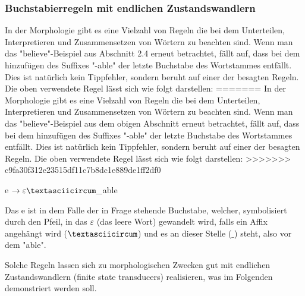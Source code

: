 \documentclass[12pt]{article}
\begin{document}
\subsubsection{Buchstabierregeln mit endlichen Zustandswandlern}

In der Morphologie gibt es eine Vielzahl von Regeln die bei dem Unterteilen, Interpretieren und Zusammensetzen von Wörtern zu beachten sind. Wenn man das "believe"-Beispiel aus Abschnitt 2.4 erneut betrachtet, fällt auf, dass bei dem hinzufügen des Suffixes "-able" der letzte Buchstabe des Wortstammes entfällt. Dies ist natürlich kein Tippfehler, sondern beruht auf einer der besagten Regeln. Die oben verwendete Regel lässt sich wie folgt darstellen:
=======
In der Morphologie gibt es eine Vielzahl von Regeln die bei dem Unterteilen, Interpretieren und Zusammensetzen von Wörtern zu beachten sind. Wenn man das "believe"-Beispiel aus dem obigen Abschnitt erneut betrachtet, fällt auf, dass bei dem hinzufügen des Suffixes "-able" der letzte Buchstabe des Wortstammes entfällt. Dies ist natürlich kein Tippfehler, sondern beruht auf einer der besagten Regeln. Die oben verwendete Regel lässt sich wie folgt darstellen:
>>>>>>> c9fa30f312e23515df11c7b8dc1e889de1ff2df0

\begin{center}
e $\rightarrow \varepsilon \textasciicircum \_$able
\end{center}

Das e ist in dem Falle der in Frage stehende Buchstabe, welcher, symbolisiert durch den Pfeil, in das $\varepsilon$ (das leere Wort) gewandelt wird, falls ein Affix angehängt wird ($\textasciicircum$) und es an dieser Stelle ($\_$) steht, also vor dem "able".

Solche Regeln lassen sich zu morphologischen Zwecken gut mit endlichen Zustandswandlern (finite state transducers) realisieren, was im Folgenden demonstriert werden soll.
\end{document}
